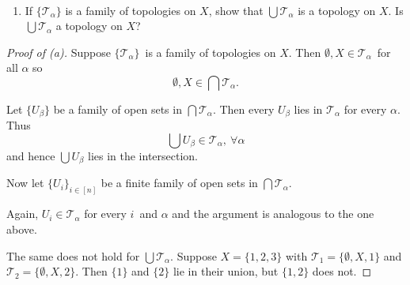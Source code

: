 \documentclass[11pt]{article}
\begin{document}
\begin{prob}[Problem 4]
    \medskip 
    \
    \begin{enumerate}[label=\alph*)]
        \item If $\{\mathcal T_\alpha\}$ is a 
            family of topologies on $X$, show that $\bigcup \mathcal T_\alpha$
            is a topology on $X$. Is $\bigcup \mathcal T_\alpha$ 
            a topology on $X$? 
    \end{enumerate}
\end{prob}
\begin{proof}[Proof of (a)]
    Suppose $\{\mathcal T_\alpha\}$ is a family of 
    topologies on $X$. Then 
    $\emptyset, X \in \mathcal T_\alpha$ for all $\alpha$ so 
    \[
        \emptyset, X \in \bigcap \mathcal T_\alpha. 
    \]

    Let $\{U_\beta\}$ be a family of open sets in 
    $\bigcap \mathcal T_\alpha$. Then 
    every $U_\beta$ lies in $\mathcal T_\alpha$ for every $\alpha$. 
    Thus 
    \[
        \bigcup U_\beta \in \mathcal T_\alpha, \ \forall \alpha
    \]
    and hence $\bigcup U_\beta$ lies in the intersection. 

    Now let $\{U_i\}_{i\in[n]}$ be a finite family of open sets in 
    $\bigcap \mathcal T_\alpha$. 

    Again, $U_i \in \mathcal T_\alpha$ for every $i$ and $\alpha$ and 
    the argument is analogous to the one above. 

    The same does not hold for $\bigcup \mathcal T_\alpha$. 
    Suppose $X = \{1,2,3\}$ with 
    $\mathcal T_1 = \{\emptyset, X, 1\}$ and $\mathcal T_2 = 
    \{\emptyset, X, 2\}$. Then 
    $\{1\}$ and $\{2\}$ lie in their union, but $\{1,2\}$ does not. 
\end{proof}
\end{document}
